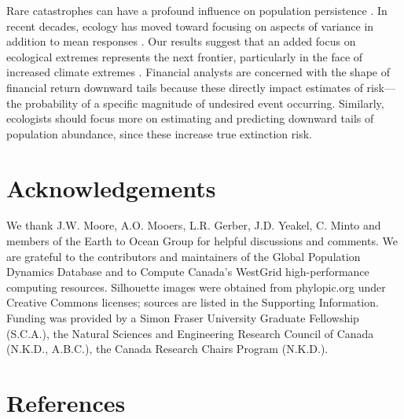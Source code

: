 Rare catastrophes can have a profound influence on population
persistence \citep{mangel1994}. In recent decades, ecology has moved toward
focusing on aspects of variance in addition to mean
responses \citep{thompson2013}. Our results suggest that an added focus on
ecological extremes represents the next frontier, particularly in the face of
increased climate extremes \citep{meehl2004, ipcc2012, thompson2013}. Financial
analysts are concerned with the shape of financial return downward tails
because these directly impact estimates of risk---the probability of a specific
magnitude of undesired event occurring. Similarly, ecologists should focus more
on estimating and predicting downward tails of population abundance, since
these increase true extinction risk.

\section{Acknowledgements}

We thank J.W. Moore, A.O. Mooers, L.R. Gerber, J.D.
Yeakel, C. Minto and members of the Earth to Ocean Group for helpful
discussions and comments. We are grateful to the contributors and maintainers
of the Global Population Dynamics Database and to Compute Canada's WestGrid
high-performance computing resources. Silhouette images were obtained from
phylopic.org under Creative Commons licenses; sources are listed in the
Supporting Information. Funding was provided by a Simon Fraser University
Graduate Fellowship (S.C.A.), the Natural Sciences and Engineering Research
Council of Canada (N.K.D., A.B.C.), the Canada Research Chairs Program
(N.K.D.).

\section{References}

\renewcommand{\section}[2]{}%




